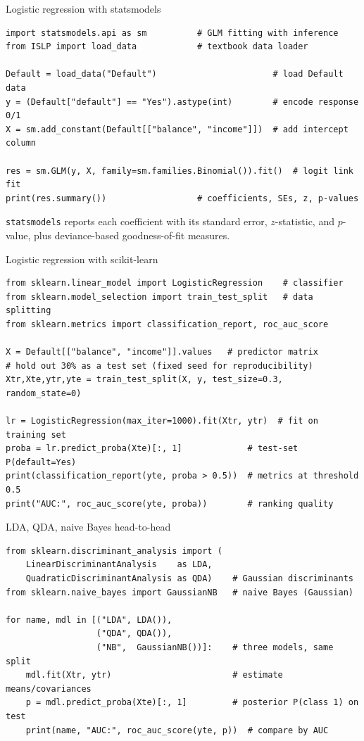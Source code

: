 \documentclass[aspectratio=169,11pt]{beamer}
\begin{document}

\begin{frame}[fragile]{Logistic regression with statsmodels}
  \begin{lstlisting}
import statsmodels.api as sm          # GLM fitting with inference
from ISLP import load_data            # textbook data loader

Default = load_data("Default")                       # load Default data
y = (Default["default"] == "Yes").astype(int)        # encode response 0/1
X = sm.add_constant(Default[["balance", "income"]])  # add intercept column

res = sm.GLM(y, X, family=sm.families.Binomial()).fit()  # logit link fit
print(res.summary())                  # coefficients, SEs, z, p-values
  \end{lstlisting}
  \texttt{statsmodels} reports each coefficient with its standard
  error, $z$-statistic, and $p$-value, plus deviance-based
  goodness-of-fit measures.
\end{frame}

\begin{frame}[fragile]{Logistic regression with scikit-learn}
  \begin{lstlisting}
from sklearn.linear_model import LogisticRegression    # classifier
from sklearn.model_selection import train_test_split   # data splitting
from sklearn.metrics import classification_report, roc_auc_score

X = Default[["balance", "income"]].values   # predictor matrix
# hold out 30% as a test set (fixed seed for reproducibility)
Xtr,Xte,ytr,yte = train_test_split(X, y, test_size=0.3, random_state=0)

lr = LogisticRegression(max_iter=1000).fit(Xtr, ytr)  # fit on training set
proba = lr.predict_proba(Xte)[:, 1]             # test-set P(default=Yes)
print(classification_report(yte, proba > 0.5))  # metrics at threshold 0.5
print("AUC:", roc_auc_score(yte, proba))        # ranking quality
  \end{lstlisting}
\end{frame}

\begin{frame}[fragile]{LDA, QDA, naive Bayes head-to-head}
  \begin{lstlisting}
from sklearn.discriminant_analysis import (
    LinearDiscriminantAnalysis    as LDA,
    QuadraticDiscriminantAnalysis as QDA)    # Gaussian discriminants
from sklearn.naive_bayes import GaussianNB   # naive Bayes (Gaussian)

for name, mdl in [("LDA", LDA()),
                  ("QDA", QDA()),
                  ("NB",  GaussianNB())]:    # three models, same split
    mdl.fit(Xtr, ytr)                        # estimate means/covariances
    p = mdl.predict_proba(Xte)[:, 1]         # posterior P(class 1) on test
    print(name, "AUC:", roc_auc_score(yte, p))  # compare by AUC
  \end{lstlisting}
\end{frame}
\end{document}
